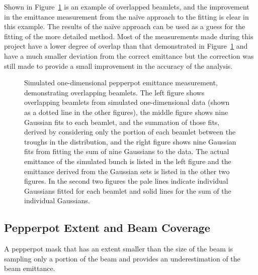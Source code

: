 Shown in Figure~\ref{figure:overlap_example} is an example of overlapped beamlets, and the improvement in the emittance measurement from the na\"ive approach to the fitting is clear in this example.
The results of the na\"ive approach can be used as a guess for the fitting of the more detailed method.
Most of the measurements made during this project have a lower degree of overlap than that demonstrated in Figure~\ref{figure:overlap_example} and have a much smaller deviation from the correct emittance but the correction was still made to provide a small improvement in the accuracy of the analysis.

\begin{figure}
    \center
    
    \caption[An example of overlapping beamlets.]{Simulated one-dimensional pepperpot emittance measurement, demonstrating overlapping beamlets.
    The left figure shows overlapping beamlets from simulated one-dimensional data (shown as a dotted line in the other figures), the middle figure shows nine Gaussian fits to each beamlet, and the summation of those fits, derived by considering only the portion of each beamlet between the troughs in the distribution, and the right figure shows nine Gaussian fits from fitting the sum of nine Gaussians to the data.
    The actual emittance of the simulated bunch is listed in the left figure and the emittance derived from the Gaussian sets is listed in the other two figures.
    In the second two figures the pale lines indicate individual Gaussians fitted for each beamlet and solid lines for the sum of the individual Gaussians.}
    \label{figure:overlap_example}
\end{figure}


\subsection{Pepperpot Extent and Beam Coverage}
A pepperpot mask that has an extent smaller than the size of the beam is sampling only a portion of the beam and provides an underestimation of the beam emittance.

